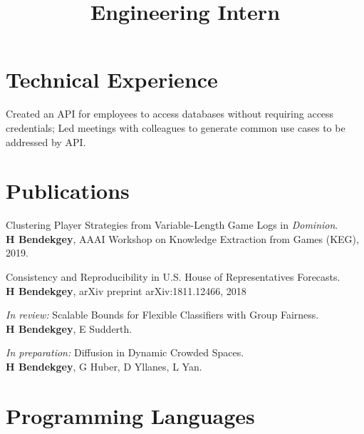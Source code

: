 \documentclass[margin]{res}
\begin{document}
\begin{resume}
\begin{position}
\end{position}

\section{Technical Experience}

\location{}
\title{\textbf{Engineering Intern}}
\begin{position}
Created an API for employees to access databases without requiring access credentials;
Led meetings with colleagues to generate common use cases to be addressed by API.\end{position}


\section{Publications}
\par
Clustering Player Strategies from Variable-Length Game Logs in \emph{Dominion}.\\ \textbf{H Bendekgey}, AAAI Workshop on Knowledge Extraction from Games (KEG), 2019.

Consistency and Reproducibility in U.S. House of Representatives Forecasts.\\ \textbf{H Bendekgey}, arXiv preprint arXiv:1811.12466, 2018

\emph{In review:} Scalable Bounds for Flexible Classifiers with Group Fairness. \\\textbf{H Bendekgey}, E Sudderth.

\emph{In preparation:} Diffusion in Dynamic Crowded Spaces. \\\textbf{H Bendekgey}, G Huber, D Yllanes, L Yan.


\section{Programming Languages}


\end{resume}
\end{document}
